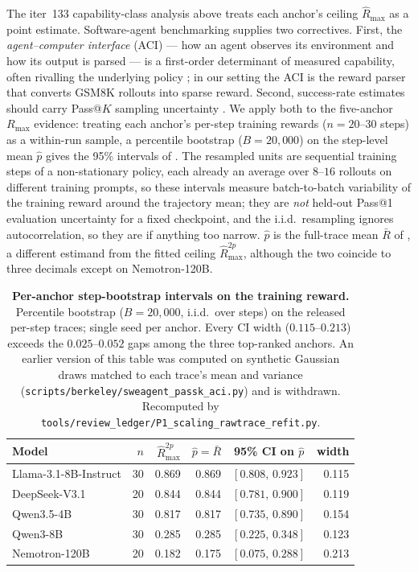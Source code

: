 The iter~133 capability-class analysis above treats each anchor's
ceiling $\hat R_{\max}$ as a point estimate.  Software-agent benchmarking
supplies two correctives.  First, the \emph{agent--computer interface}
(ACI) --- how an agent observes its environment and how its output is
parsed --- is a first-order determinant of measured capability, often
rivalling the underlying policy \citep{yang2024sweagent,
wang2024openhands}; in our setting the ACI is the reward parser that
converts GSM8K rollouts into sparse reward.  Second, success-rate
estimates should carry Pass@$K$ sampling uncertainty
\citep{chen2021codex}.  We apply both to the five-anchor
$R_{\max}$ evidence: treating each anchor's per-step training rewards
($n = 20$--$30$ steps) as a within-run sample, a percentile
bootstrap ($B = 20{,}000$) on the step-level mean $\hat p$ gives the
95\% intervals of .  The resampled units
are sequential training steps of a non-stationary policy, each already
an average over $8$--$16$ rollouts on different training prompts, so
these intervals measure batch-to-batch variability of the training
reward around the trajectory mean; they are \emph{not} held-out Pass@1
evaluation uncertainty for a fixed checkpoint, and the i.i.d.\
resampling ignores autocorrelation, so they are if anything too
narrow.  $\hat p$ is the full-trace mean $\bar R$ of
, a different estimand from the fitted
ceiling $\hat R_{\max}^{2p}$, although the two coincide to three
decimals except on Nemotron-120B.

\begin{table}[t]
  \centering
  \small
  \begin{tabular}{lrrrcr}
    \toprule
    Model & $n$ & $\hat R_{\max}^{2p}$ & $\hat p = \bar R$ &
    95\% CI on $\hat p$ & width \\
    \midrule
    Llama-3.1-8B-Instruct & 30 & 0.869 & 0.869 & $[0.808,\,0.923]$ & 0.115 \\
    DeepSeek-V3.1         & 20 & 0.844 & 0.844 & $[0.781,\,0.900]$ & 0.119 \\
    Qwen3.5-4B            & 30 & 0.817 & 0.817 & $[0.735,\,0.890]$ & 0.154 \\
    Qwen3-8B              & 30 & 0.285 & 0.285 & $[0.225,\,0.348]$ & 0.123 \\
    Nemotron-120B         & 20 & 0.182 & 0.175 & $[0.075,\,0.288]$ & 0.213 \\
    \bottomrule
  \end{tabular}
  \caption{\textbf{Per-anchor step-bootstrap intervals on the training
    reward.}  Percentile bootstrap ($B = 20{,}000$, i.i.d.\ over steps)
    on the released per-step traces; single seed per anchor.  Every CI
    width ($0.115$--$0.213$) exceeds the $0.025$--$0.052$ gaps among the
    three top-ranked anchors.  An earlier version of this table was
    computed on synthetic Gaussian draws matched to each trace's mean and
    variance (\texttt{scripts/berkeley/sweagent\_passk\_aci.py}) and is
    withdrawn.  Recomputed by
    \texttt{tools/review\_ledger/P1\_scaling\_rawtrace\_refit.py}.}
  \label{tab:scaling-passk-ci}
\end{table}

